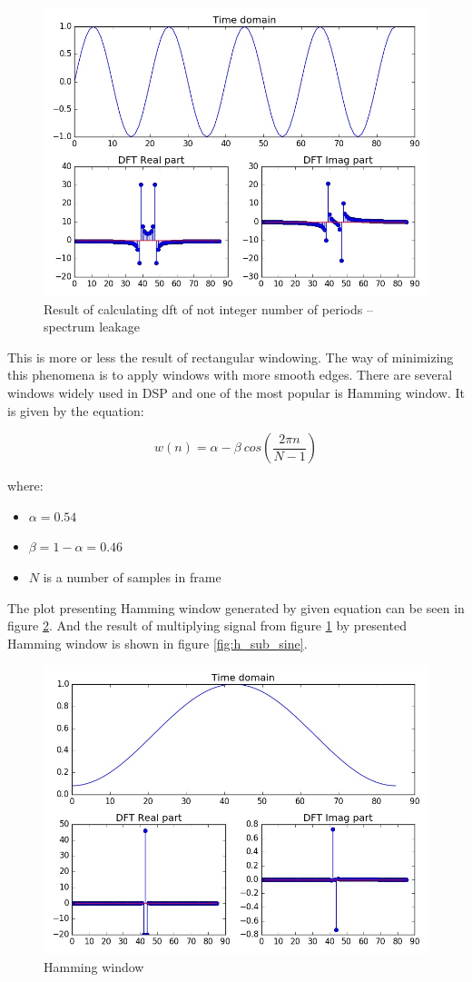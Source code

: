\documentclass[magister]{dyplom}
\begin{document}
	\begin{figure} [!th]
		\centering
		\includegraphics[width=0.7\linewidth]{images/sub_sine}
		\caption{Result of calculating dft of not integer number of periods -- spectrum leakage}
		\label{fig:sub_sine}
	\end{figure}

	
	 This is more or less the result of rectangular windowing. The way of minimizing this phenomena is to apply windows with more smooth edges. There are several windows widely used in \gls{DSP} and one of the most popular is Hamming window. It is given by the equation:
	
	\begin{equation}
		w(n) = \alpha - \beta \ cos \left( \frac{2\pi n}{N - 1} \right)
	\end{equation}
	
	where:
	
	\begin{itemize}
		\item $\alpha = 0.54$
		\item $\beta = 1 - \alpha = 0.46$
		\item $N$ is a number of samples in frame
	\end{itemize}
	
	The plot presenting Hamming window generated by given equation can be seen in figure \ref{fig:hamming}. And the result of multiplying signal from figure \ref{fig:sub_sine} by presented Hamming window is shown in figure \ref{fig:h_sub_sine}. \\
	
	\begin{figure} [!th]
		\centering
		\includegraphics[width=0.7\linewidth]{images/hamming}
		\caption{Hamming window}
		\label{fig:hamming}
	\end{figure}
	
\end{document}
